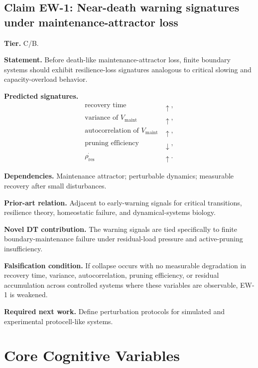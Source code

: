 \documentclass[10pt,a4paper,twocolumn,aps,prl]{revtex4-2}
\theoremstyle{claimstyle}
\theoremstyle{definition}
\newcommand{\claimfield}[1]{\noindent\textbf{#1.}}
\newcommand{\rhodebt}{\rho_{\mathrm{res}}}
\newcommand{\Vlife}{V_{\mathrm{maint}}}
\begin{document}
\subsection{Claim EW-1: Near-death warning signatures under maintenance-attractor loss}

\claimfield{Tier} C/B.

\claimfield{Statement} Before death-like maintenance-attractor loss, finite boundary systems should exhibit resilience-loss signatures analogous to critical slowing and capacity-overload behavior.

\claimfield{Predicted signatures}
\begin{align}
\text{recovery time} &\uparrow,\\
\text{variance of } \Vlife &\uparrow,\\
\text{autocorrelation of } \Vlife &\uparrow,\\
\text{pruning efficiency} &\downarrow,\\
\dot{\rhodebt} &\uparrow.
\end{align}

\claimfield{Dependencies} Maintenance attractor; perturbable dynamics; measurable recovery after small disturbances.

\claimfield{Prior-art relation} Adjacent to early-warning signals for critical transitions, resilience theory, homeostatic failure, and dynamical-systems biology.

\claimfield{Novel DT contribution} The warning signals are tied specifically to finite boundary-maintenance failure under residual-load pressure and active-pruning insufficiency.

\claimfield{Falsification condition} If collapse occurs with no measurable degradation in recovery time, variance, autocorrelation, pruning efficiency, or residual accumulation across controlled systems where these variables are observable, EW-1 is weakened.

\claimfield{Required next work} Define perturbation protocols for simulated and experimental protocell-like systems.

\section{Core Cognitive Variables}
\end{document}

